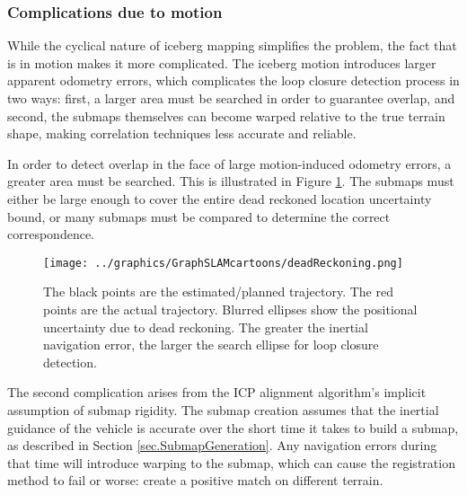 \subsubsection{Complications due to motion} 

While the cyclical nature of iceberg mapping simplifies the problem, the fact that is in motion makes it more complicated. The iceberg motion introduces larger apparent odometry errors, which complicates the loop closure detection process in two ways: first, a larger area must be searched in order to guarantee overlap, and second, the submaps themselves can become warped relative to the true terrain shape, making correlation techniques less accurate and reliable.


In order to detect overlap in the face of large motion-induced odometry errors, a greater area must be searched. This is illustrated in Figure \ref{fig:BathyMapping3}. The submaps must either be large enough to cover the entire dead reckoned location uncertainty bound, or many submaps must be compared to determine the correct correspondence. 

 \begin{figure}[htb]
   \centering
   \texttt{[image: ../graphics/GraphSLAMcartoons/deadReckoning.png]} %
   \caption{The black points are the estimated/planned trajectory. The red points are the actual trajectory. Blurred ellipses show the positional uncertainty due to dead reckoning. The greater the inertial navigation error, the larger the search ellipse for loop closure detection.  }
   \label{fig:BathyMapping3}
\end{figure}


The second complication arises from the ICP alignment algorithm's implicit assumption of submap rigidity. The submap creation assumes that the inertial guidance of the vehicle is accurate over the short time it takes to build a submap, as described in Section \ref{sec.SubmapGeneration}. Any navigation errors during that time will introduce warping to the submap, which can cause the registration method to fail or worse: create a positive match on different terrain. 

